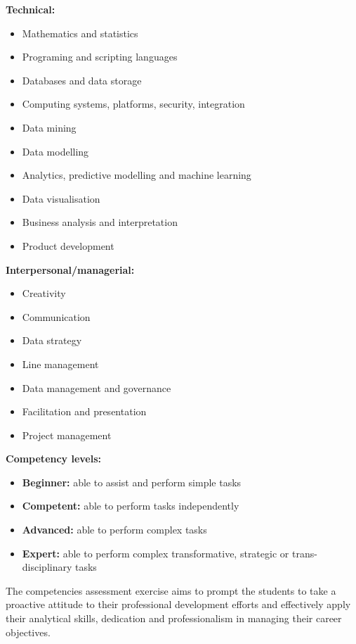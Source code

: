 \documentclass[]{book}
\providecommand{\tightlist}{%
  \setlength{\itemsep}{0pt}\setlength{\parskip}{0pt}}
\theoremstyle{definition}
\theoremstyle{definition}
\theoremstyle{remark}
\begin{document}
\textbf{Technical:}

\begin{itemize}
\tightlist
\item
  Mathematics and statistics
\item
  Programing and scripting languages
\item
  Databases and data storage
\item
  Computing systems, platforms, security, integration
\item
  Data mining
\item
  Data modelling
\item
  Analytics, predictive modelling and machine learning
\item
  Data visualisation
\item
  Business analysis and interpretation
\item
  Product development
\end{itemize}

\textbf{Interpersonal/managerial:}

\begin{itemize}
\tightlist
\item
  Creativity
\item
  Communication
\item
  Data strategy
\item
  Line management
\item
  Data management and governance
\item
  Facilitation and presentation
\item
  Project management
\end{itemize}

\textbf{Competency levels:}

\begin{itemize}
\tightlist
\item
  \textbf{Beginner:} able to assist and perform simple tasks
\item
  \textbf{Competent:} able to perform tasks independently
\item
  \textbf{Advanced:} able to perform complex tasks
\item
  \textbf{Expert:} able to perform complex transformative, strategic or
  trans-disciplinary tasks
\end{itemize}

The competencies assessment exercise aims to prompt the students to take
a proactive attitude to their professional development efforts and
effectively apply their analytical skills, dedication and
professionalism in managing their career objectives.
\end{document}
